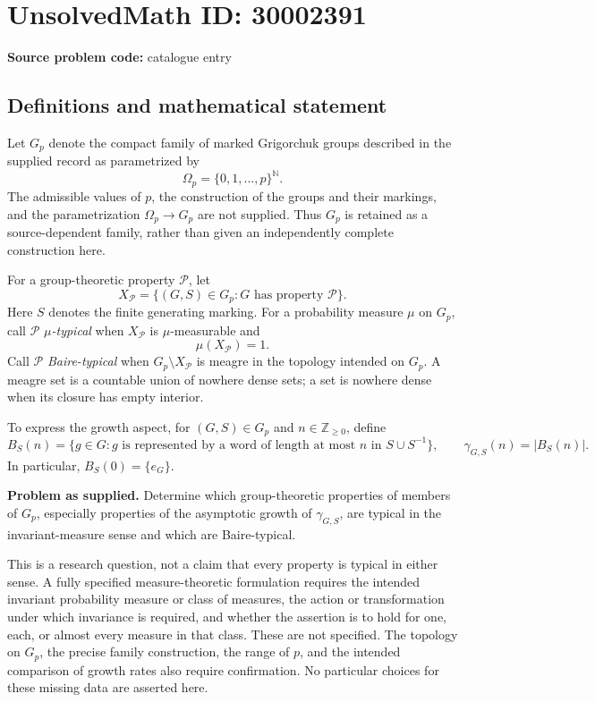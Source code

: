 \documentclass[11pt]{article}
\newcommand{\N}{\mathbb{N}}
\newcommand{\Z}{\mathbb{Z}}
\begin{document}
\section*{UnsolvedMath ID: 30002391}
\textbf{Source problem code:} catalogue entry
\subsection{Definitions and mathematical statement}
Let \(G_p\) denote the compact family of marked Grigorchuk groups described in the supplied record as parametrized by
\[
\Omega_p=\{0,1,\ldots,p\}^{\N}.
\]
The admissible values of \(p\), the construction of the groups and their markings, and the parametrization \(\Omega_p\to G_p\) are not supplied. Thus \(G_p\) is retained as a source-dependent family, rather than given an independently complete construction here.

For a group-theoretic property \(\mathcal P\), let
\[
X_{\mathcal P}=\{(G,S)\in G_p:G\text{ has property }\mathcal P\}.
\]
Here \(S\) denotes the finite generating marking. For a probability measure \(\mu\) on \(G_p\), call \(\mathcal P\) \emph{\(\mu\)-typical} when \(X_{\mathcal P}\) is \(\mu\)-measurable and
\[
\mu(X_{\mathcal P})=1.
\]
Call \(\mathcal P\) \emph{Baire-typical} when \(G_p\setminus X_{\mathcal P}\) is meagre in the topology intended on \(G_p\). A meagre set is a countable union of nowhere dense sets; a set is nowhere dense when its closure has empty interior.

To express the growth aspect, for \((G,S)\in G_p\) and \(n\in\Z_{\geq0}\), define
\[
B_S(n)=\{g\in G:g\text{ is represented by a word of length at most }n
\text{ in }S\cup S^{-1}\},\qquad
\gamma_{G,S}(n)=|B_S(n)|.
\]
In particular, \(B_S(0)=\{e_G\}\).

\textbf{Problem as supplied.} Determine which group-theoretic properties of members of \(G_p\), especially properties of the asymptotic growth of \(\gamma_{G,S}\), are typical in the invariant-measure sense and which are Baire-typical.

This is a research question, not a claim that every property is typical in either sense. A fully specified measure-theoretic formulation requires the intended invariant probability measure or class of measures, the action or transformation under which invariance is required, and whether the assertion is to hold for one, each, or almost every measure in that class. These are not specified. The topology on \(G_p\), the precise family construction, the range of \(p\), and the intended comparison of growth rates also require confirmation. No particular choices for these missing data are asserted here.
\end{document}

